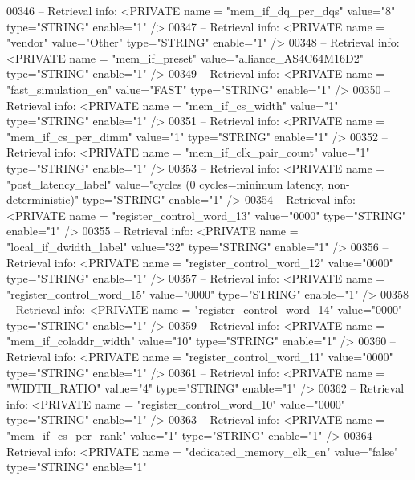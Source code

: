 \begin{DoxyCode}
{00346 \textcolor{keyword}{-- Retrieval info:      <PRIVATE name = "mem\_if\_dq\_per\_dqs" value="8"  type="STRING"  enable="1" />}
00347 \textcolor{keyword}{-- Retrieval info:      <PRIVATE name = "vendor" value="Other"  type="STRING"  enable="1" />}
00348 \textcolor{keyword}{-- Retrieval info:      <PRIVATE name = "mem\_if\_preset" value="alliance\_AS4C64M16D2"  type="STRING" 
       enable="1" />}
00349 \textcolor{keyword}{-- Retrieval info:      <PRIVATE name = "fast\_simulation\_en" value="FAST"  type="STRING"  enable="1" />}
00350 \textcolor{keyword}{-- Retrieval info:      <PRIVATE name = "mem\_if\_cs\_width" value="1"  type="STRING"  enable="1" />}
00351 \textcolor{keyword}{-- Retrieval info:      <PRIVATE name = "mem\_if\_cs\_per\_dimm" value="1"  type="STRING"  enable="1" />}
00352 \textcolor{keyword}{-- Retrieval info:      <PRIVATE name = "mem\_if\_clk\_pair\_count" value="1"  type="STRING"  enable="1" />}
00353 \textcolor{keyword}{-- Retrieval info:      <PRIVATE name = "post\_latency\_label" value="cycles (0 cycles=minimum latency,
       non-deterministic)"  type="STRING"  enable="1" />}
00354 \textcolor{keyword}{-- Retrieval info:      <PRIVATE name = "register\_control\_word\_13" value="0000"  type="STRING"  enable="1"
       />}
00355 \textcolor{keyword}{-- Retrieval info:      <PRIVATE name = "local\_if\_dwidth\_label" value="32"  type="STRING"  enable="1" />}
00356 \textcolor{keyword}{-- Retrieval info:      <PRIVATE name = "register\_control\_word\_12" value="0000"  type="STRING"  enable="1"
       />}
00357 \textcolor{keyword}{-- Retrieval info:      <PRIVATE name = "register\_control\_word\_15" value="0000"  type="STRING"  enable="1"
       />}
00358 \textcolor{keyword}{-- Retrieval info:      <PRIVATE name = "register\_control\_word\_14" value="0000"  type="STRING"  enable="1"
       />}
00359 \textcolor{keyword}{-- Retrieval info:      <PRIVATE name = "mem\_if\_coladdr\_width" value="10"  type="STRING"  enable="1" />}
00360 \textcolor{keyword}{-- Retrieval info:      <PRIVATE name = "register\_control\_word\_11" value="0000"  type="STRING"  enable="1"
       />}
00361 \textcolor{keyword}{-- Retrieval info:      <PRIVATE name = "WIDTH\_RATIO" value="4"  type="STRING"  enable="1" />}
00362 \textcolor{keyword}{-- Retrieval info:      <PRIVATE name = "register\_control\_word\_10" value="0000"  type="STRING"  enable="1"
       />}
00363 \textcolor{keyword}{-- Retrieval info:      <PRIVATE name = "mem\_if\_cs\_per\_rank" value="1"  type="STRING"  enable="1" />}
00364 \textcolor{keyword}{-- Retrieval info:      <PRIVATE name = "dedicated\_memory\_clk\_en" value="false"  type="STRING"  enable="1"
}}
\end{DoxyCode}
